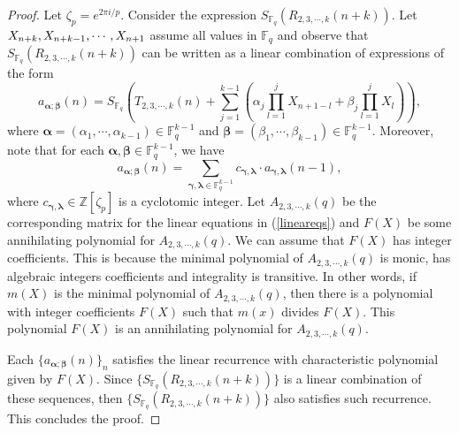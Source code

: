 \begin{proof}
 Let $\zeta_p=e^{2\pi i/p}$. Consider the expression $S_{\mathbb{F}_q}(R_{2,3,\cdots, k}(n+k))$.  Let $X_{n+k}, X_{n+k-1}, \cdots,\\ X_{n+1}$ assume all values in $\mathbb{F}_q$ and observe that $S_{\mathbb{F}_q}(R_{2,3,\cdots, k}(n+k))$
 can be written as a linear combination of expressions of the form
 \begin{equation}
 \label{generatingseqs}
  a_{\boldsymbol{\alpha};\boldsymbol{\beta}}(n)=S_{\mathbb{F}_q}\left(T_{2,3,\cdots, k}(n)+\sum _{j=1}^{k-1} \left(\alpha _j \prod _{l=1}^j X_{n+1-l}+\beta _j \prod _{l=1}^j X_l\right)\right),
 \end{equation}
 where $\boldsymbol{\alpha}=(\alpha_1,\cdots,\alpha_{k-1}) \in \mathbb{F}_q^{k-1}$ and $\boldsymbol{\beta}=(\beta_1,\cdots,\beta_{k-1}) \in \mathbb{F}_q^{k-1}$.
Moreover, note that for each $\boldsymbol{\alpha},\boldsymbol{\beta} \in \mathbb{F}_q^{k-1}$, we have
 \begin{equation}
 \label{lineareqs}
  a_{\boldsymbol{\alpha};\boldsymbol{\beta}}(n) = \sum_{\boldsymbol{\gamma},\boldsymbol{\lambda}\in \mathbb{F}_q^{k-1}}c_{\boldsymbol{\gamma},\boldsymbol{\lambda}}\cdot a_{\boldsymbol{\gamma},\boldsymbol{\lambda}}(n-1),
 \end{equation}
where $c_{\boldsymbol{\gamma},\boldsymbol{\lambda}} \in \mathbb{Z}[\zeta_p]$ is a cyclotomic integer.  Let $A_{2,3,\cdots, k}(q)$ be the corresponding matrix for the linear equations in (\ref{lineareqs}) and
$F(X)$ be some annihilating polynomial for $A_{2,3,\cdots, k}(q)$.   We can assume that $F(X)$ has integer coefficients.  This is because the minimal polynomial of $A_{2,3,\cdots,k}(q)$ is monic, 
has algebraic integers coefficients and integrality is transitive.  In other words, if $m(X)$ is the minimal polynomial of $A_{2,3,\cdots,k}(q)$, then there is a polynomial with integer coefficients $F(X)$ 
such that $m(x)$ divides $F(X)$.  This polynomial $F(X)$ is an annihilating polynomial for $A_{2,3,\cdots,k}(q)$.

Each $\{a_{\boldsymbol{\alpha};\boldsymbol{\beta}}(n)\}_n$ satisfies the linear recurrence with characteristic polynomial given
by $F(X)$. Since $\{S_{\mathbb{F}_q}(R_{2,3,\cdots, k}(n+k))\}$ is a linear combination of these sequences, then $\{S_{\mathbb{F}_q}(R_{2,3,\cdots, k}(n+k))\}$ also satisfies such recurrence.
This concludes the proof.
\end{proof}


